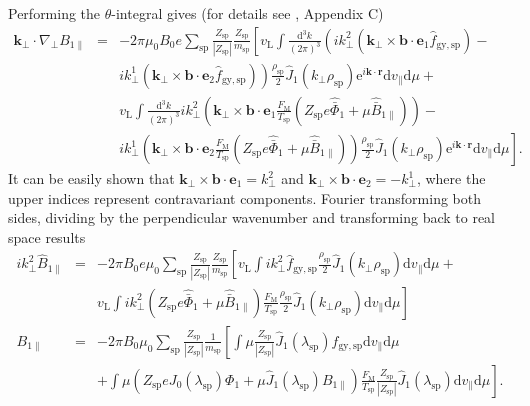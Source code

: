 \documentclass[a4paper,10pt]{article}
\newcommand{\st}[1]{\mathrm{#1}} %
\renewcommand{\vec}[1]{\mathbf{#1}}
\begin{document}
Performing the $\theta$-integral gives (for details see \cite{dannert}, Appendix C)
\begin{eqnarray*}
	\vec{k}_{\perp} \cdot \nabla_{\perp} B_{1 \parallel} &=& - 2 \pi \mu_0 B_0 e \sum_{\st{sp}} \frac{Z_{\st{sp}}}{|Z_{\st{sp}}|} \frac{Z_{\st{sp}}}{m_{\st{sp}}} \left[ v_{\st{L}} \int \frac{\mathrm{d}^3 k}{(2 \pi)^3} \left( i k_{\perp}^2 (\vec{k}_{\perp} \times \vec{b} \cdot \vec{e}_1 \hat{f}_{\st{gy,sp}}) - \right. \right. \\ 
	&& \left. i k_{\perp}^1 (\vec{k}_{\perp} \times \vec{b} \cdot \vec{e}_2 \hat{f}_{\st{gy,sp}}) \right) \frac{\rho_{\st{sp}}}{2} \hat{J}_1(k_{\perp} \rho_{\st{sp}}) \mathrm{e}^{i \vec{k} \cdot \vec{r}} \mathrm{d} v_{\parallel} \mathrm{d} \mu + \\
	&& v_{\st{L}} \int \frac{\mathrm{d}^3 k}{(2 \pi)^3} i k_{\perp}^2 \left( \vec{k}_{\perp} \times \vec{b} \cdot \vec{e}_1 \frac{F_{\st{M}}}{T_{\st{sp}}} \left( Z_{\st{sp}} e \hat{\bar{\Phi}}_1 + \mu \hat{\bar{B}}_{1 \parallel} \right) \right) - \\ 
	&& \left. i k_{\perp}^1 \left( \vec{k}_{\perp} \times \vec{b} \cdot \vec{e}_2 \frac{F_{\st{M}}}{T_{\st{sp}}} \left( Z_{\st{sp}} e \hat{\bar{\Phi}}_1 + \mu \hat{\bar{B}}_{1 \parallel} \right) \right) \frac{\rho_{\st{sp}}}{2} \hat{J}_1(k_{\perp} \rho_{\st{sp}}) \mathrm{e}^{i \vec{k} \cdot \vec{r}} \mathrm{d} v_{\parallel} \mathrm{d} \mu \right].
\end{eqnarray*}
It can be easily shown that $\vec{k}_{\perp} \times \vec{b} \cdot \vec{e}_1 = k_{\perp}^2$ and $\vec{k}_{\perp} \times \vec{b} \cdot \vec{e}_2 = -k_{\perp}^1$, where the upper indices represent contravariant components. Fourier transforming both sides, dividing by the perpendicular wavenumber and transforming back to real space results
\begin{eqnarray*}
	i k_{\perp}^2 \hat{B}_{1 \parallel} &=& - 2 \pi B_0 e \mu_0 \sum_{\st{sp}} \frac{Z_{\st{sp}}}{|Z_{\st{sp}}|} \frac{Z_{\st{sp}}}{m_{\st{sp}}} \left[ v_{\st{L}} \int i k_{\perp}^2 \hat{f}_{\st{gy,sp}} \frac{\rho_{\st{sp}}}{2} \hat{J}_1(k_{\perp} \rho_{\st{sp}}) \mathrm{d} v_{\parallel} \mathrm{d} \mu \right. + \\ 
	&& \left. v_{\st{L}} \int i k_{\perp}^2 \left( Z_{\st{sp}} e \hat{\bar{\Phi}}_1 + \mu \hat{\bar{B}}_{1 \parallel} \right) \frac{F_{\st{M}}}{T_{\st{sp}}} \frac{\rho_{\st{sp}}}{2} \hat{J}_1(k_{\perp} \rho_{\st{sp}}) \mathrm{d} v_{\parallel} \mathrm{d} \mu \right] \\
	B_{1 \parallel} &=& - 2 \pi B_0 \mu_0 \sum_{\st{sp}} \frac{Z_{\st{sp}}}{|Z_{\st{sp}}|} \frac{1}{m_{\st{sp}}} \left[ \int \mu \frac{Z_{\st{sp}}}{|Z_{\st{sp}}|} \hat{J}_1(\lambda_{\st{sp}}) f_{\st{gy,sp}} \mathrm{d} v_{\parallel} \mathrm{d} \mu \right. \\
	&& \left. + \int \mu \left( Z_{\st{sp}} e J_0(\lambda_{\st{sp}}) \Phi_1 + \mu \hat{J}_1(\lambda_{\st{sp}}) B_{1 \parallel} \right) \frac{F_{\st{M}}}{T_{\st{sp}}} \frac{Z_{\st{sp}}}{|Z_{\st{sp}}|} \hat{J}_{1}(\lambda_{\st{sp}}) \mathrm{d} v_{\parallel} \mathrm{d} \mu \right].
\end{eqnarray*}
\end{document}
